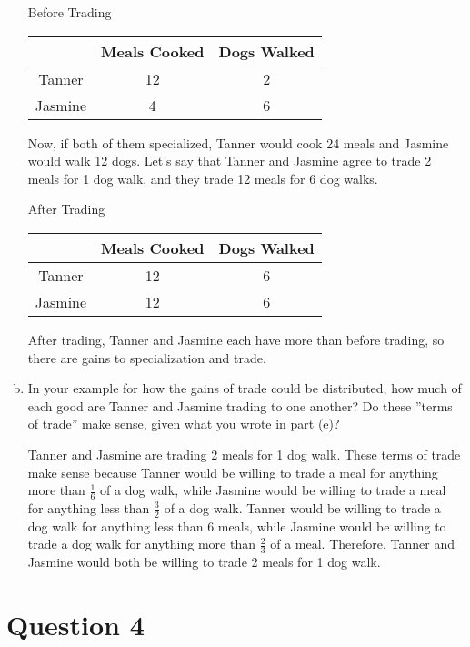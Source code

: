 \documentclass{article}
\newcommand{\question}[1]{\pagebreak\section{Question #1}}
\begin{document}
\begin{enumerate}[(a)]
\begin{center}
    Before Trading\\
    \begin{tabular}{ |c|c|c| } 
     \hline
      & Meals Cooked & Dogs Walked \\ 
     \hline
    Tanner & 12 & 2 \\
    \hline
    Jasmine & 4 & 6 \\
    \hline
    \end{tabular}
\end{center}

Now, if both of them specialized, Tanner would cook 24 meals and Jasmine would walk 12 dogs. Let's say that Tanner and Jasmine agree to trade 2 meals for 1 dog walk, and they trade 12 meals for 6 dog walks. 

\begin{center}
    After Trading\\
    \begin{tabular}{ |c|c|c| } 
     \hline
      & Meals Cooked & Dogs Walked \\ 
     \hline
    Tanner & 12 & 6 \\
    \hline
    Jasmine & 12 & 6 \\
    \hline
    \end{tabular}
\end{center}

After trading, Tanner and Jasmine each have more than before trading, so there are gains to specialization and trade.
\pagebreak
    \item In your example for how the gains of trade could be distributed,
how much of each good are Tanner and Jasmine trading to one
another? Do these ”terms of trade” make sense, given what you
wrote in part (e)?

    Tanner and Jasmine are trading 2 meals for 1 dog walk. These terms of trade make sense because Tanner would be willing to trade a meal for anything more than \(\frac{1}{6}\) of a dog walk, while Jasmine would be willing to trade a meal for anything less than \(\frac{3}{2}\) of a dog walk. Tanner would be willing to trade a dog walk for anything less than 6 meals, while Jasmine would be willing to trade a dog walk for anything more than \(\frac{2}{3}\) of a meal. Therefore, Tanner and Jasmine would both be willing to trade 2 meals for 1 dog walk.
\end{enumerate}

\question{4}
\end{document}
